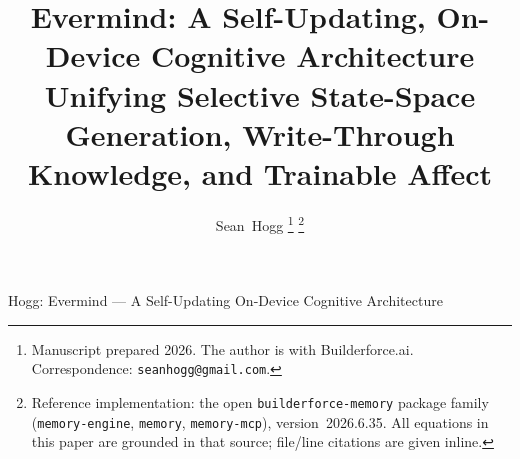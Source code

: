 \documentclass[journal,onecolumn,11pt]{IEEEtran}
\begin{document}
\title{Evermind: A Self-Updating, On-Device Cognitive Architecture\\
Unifying Selective State-Space Generation, Write-Through\\
Knowledge, and Trainable Affect}

\author{Sean~Hogg%
\thanks{Manuscript prepared 2026. The author is with Builderforce.ai.
Correspondence: \texttt{seanhogg@gmail.com}.}%
\thanks{Reference implementation: the open \texttt{builderforce-memory} package
family (\texttt{memory-engine}, \texttt{memory}, \texttt{memory-mcp}),
version~2026.6.35. All equations in this paper are grounded in that source;
file/line citations are given inline.}}

%
{Hogg: Evermind --- A Self-Updating On-Device Cognitive Architecture}

\maketitle
\end{document}
